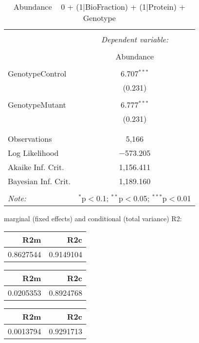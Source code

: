 \documentclass[11pt]{report}
\begin{document}
\begin{table}[!htbp] \centering 
  \caption{Abundance ~ 0 + (1|BioFraction) + (1|Protein) + Genotype} 
  \label{} 
\begin{tabular}{@{\extracolsep{5pt}}lc} 
\\[-1.8ex]\hline 
\hline \\[-1.8ex] 
 & \multicolumn{1}{c}{\textit{Dependent variable:}} \\ 
\cline{2-2} 
\\[-1.8ex] & Abundance \\ 
\hline \\[-1.8ex] 
 GenotypeControl & 6.707$^{***}$ \\ 
  & (0.231) \\ 
  & \\ 
 GenotypeMutant & 6.777$^{***}$ \\ 
  & (0.231) \\ 
  & \\ 
\hline \\[-1.8ex] 
Observations & 5,166 \\ 
Log Likelihood & $-$573.205 \\ 
Akaike Inf. Crit. & 1,156.411 \\ 
Bayesian Inf. Crit. & 1,189.160 \\ 
\hline 
\hline \\[-1.8ex] 
\textit{Note:}  & \multicolumn{1}{r}{$^{*}$p$<$0.1; $^{**}$p$<$0.05; $^{***}$p$<$0.01} \\ 
\end{tabular} 
\end{table} 
marginal (fixed effects) and conditional (total variance) R2:

\begin{tabular}{r|r}
\hline
R2m & R2c\\
\hline
0.8627544 & 0.9149104\\
\hline
\end{tabular}

\begin{tabular}{r|r}
\hline
R2m & R2c\\
\hline
0.0205353 & 0.8924768\\
\hline
\end{tabular}

\begin{tabular}{r|r}
\hline
R2m & R2c\\
\hline
0.0013794 & 0.9291713\\
\hline
\end{tabular}
\end{document}

